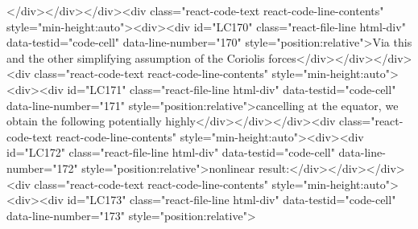 {{</div></div></div><div class="react-code-text react-code-line-contents" style="min-height:auto"><div><div id="LC170" class="react-file-line html-div" data-testid="code-cell" data-line-number="170" style="position:relative">Via this and the other simplifying assumption of the Coriolis forces</div></div></div><div class="react-code-text react-code-line-contents" style="min-height:auto"><div><div id="LC171" class="react-file-line html-div" data-testid="code-cell" data-line-number="171" style="position:relative">cancelling at the equator, we obtain the following potentially highly</div></div></div><div class="react-code-text react-code-line-contents" style="min-height:auto"><div><div id="LC172" class="react-file-line html-div" data-testid="code-cell" data-line-number="172" style="position:relative">nonlinear result:</div></div></div><div class="react-code-text react-code-line-contents" style="min-height:auto"><div><div id="LC173" class="react-file-line html-div" data-testid="code-cell" data-line-number="173" style="position:relative">
}}
